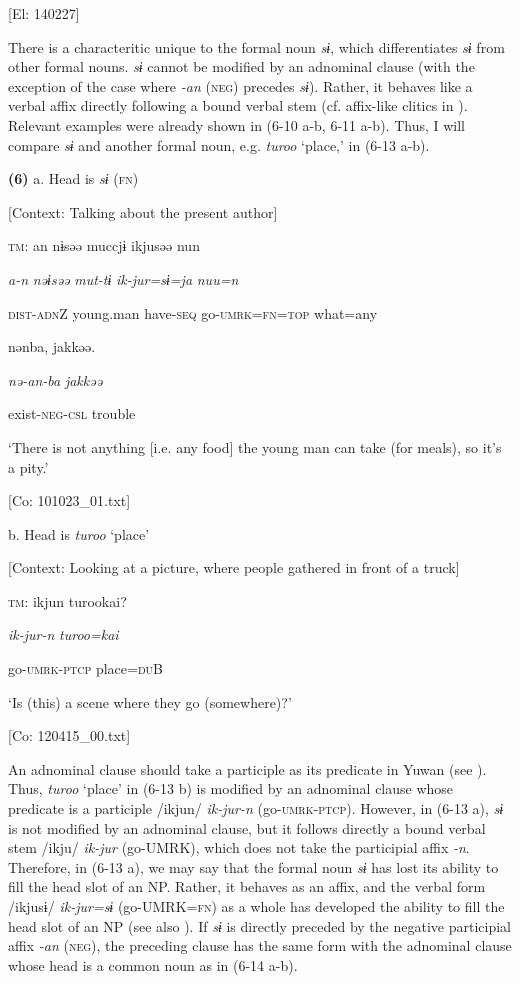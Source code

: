       [El: 140227]

There is a characteritic unique to the formal noun \textit{sɨ}, which differentiates \textit{sɨ} from other formal nouns. \textit{sɨ} cannot be modified by an adnominal clause (with the exception of the case where \textit{{}-an} (\textsc{neg}) precedes \textit{sɨ}). Rather, it behaves like a verbal affix directly following a bound verbal stem (cf. affix-like clitics in ). Relevant examples were already shown in (6-10 a-b, 6-11 a-b). Thus, I will compare \textit{sɨ} and another formal noun, e.g. \textit{turoo} ‘place,’ in (6-13 a-b).

\textbf{(6)}  a. Head is \textit{sɨ} (\textsc{fn})

  [Context: Talking about the present author]

  \textsc{tm}:  an  nɨsəə  muccjɨ  ikjusəə  nun

    \textit{a-n}  \textit{nəɨsəə}  \textit{mut-tɨ}  \textit{ik-jur=sɨ=ja}  \textit{nuu=n}

    \textsc{dist}-\textsc{adn}Z  young.man  have-\textsc{seq}  go-\textsc{umrk}=\textsc{fn}=\textsc{top}  what=any

    nənba,  jakkəə.

    \textit{nə-an-ba}  \textit{jakkəə}

    exist-\textsc{neg}-\textsc{csl}  trouble

    ‘There is not anything [i.e. any food] the young man can take (for meals), so it’s a pity.’

    [Co: 101023\_01.txt]

  b. Head is \textit{turoo} ‘place’

  [Context: Looking at a picture, where people gathered in front of a truck]

  \textsc{tm}:  ikjun  turookai?

    \textit{ik-jur-n}  \textit{turoo=kai}

    go-\textsc{umrk}-\textsc{ptcp}  place=\textsc{du}B

    ‘Is (this) a scene where they go (somewhere)?’

    [Co: 120415\_00.txt]

An adnominal clause should take a participle as its predicate in Yuwan (see ). Thus, \textit{turoo} ‘place’ in (6-13 b) is modified by an adnominal clause whose predicate is a participle /ikjun/ \textit{ik-jur-n} (go-\textsc{umrk}-\textsc{ptcp}). However, in (6-13 a), \textit{sɨ} is not modified by an adnominal clause, but it follows directly a bound verbal stem /ikju/ \textit{ik-jur} (go-UMRK), which does not take the participial affix \textit{{}-n}. Therefore, in (6-13 a), we may say that the formal noun \textit{sɨ} has lost its ability to fill the head slot of an NP. Rather, it behaves as an affix, and the verbal form /ikjusɨ/ \textit{ik-jur=sɨ} (go-UMRK=\textsc{fn}) as a whole has developed the ability to fill the head slot of an NP (see also ). If \textit{sɨ} is directly preceded by the negative participial affix \textit{{}-an} (\textsc{neg}), the preceding clause has the same form with the adnominal clause whose head is a common noun as in (6-14 a-b).

